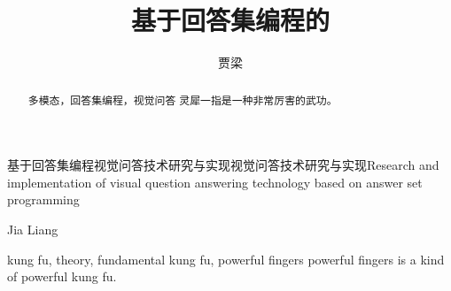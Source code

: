 \title{基于回答集编程的}{基于回答集编程}{视觉问答技术研究与实现}{视觉问答技术研究与实现}{Research and implementation of visual question answering technology }{based on answer set programming}
\author{贾梁}{Jia Liang}
\makebigcover
\makecover
\begin{abstract}{多模态，回答集编程，视觉问答}
    灵犀一指是一种非常厉害的武功。
\end{abstract}

\begin{englishabstract}{kung fu, theory, fundamental kung fu, powerful fingers}
    powerful fingers is a kind of powerful kung fu.
\end{englishabstract}

\tableofcontents
\listofothers
